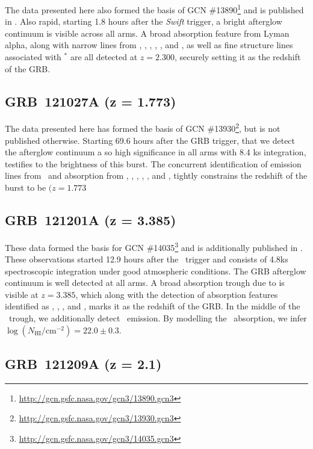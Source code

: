 \documentclass{aa}    %
\begin{document}
The data presented here also formed the basis of GCN
\#13890\footnote{\url{http://gcn.gsfc.nasa.gov/gcn3/13890.gcn3}} and is
published in \citet{Friis2015}. Also rapid, starting 1.8 hours after the
\textit{Swift} trigger, a bright afterglow continuum is visible across all arms.
A broad absorption feature from Lyman alpha, along with narrow lines from \civ,
\SIii, \SIiv, \feii, \sii, and \alii, as well as fine structure lines associated
with \SIii$^*$ are all detected at $z = 2.300$, securely setting it as the
redshift of the GRB.

\subsection{GRB~121027A (z = 1.773)}

The data presented here has formed the basis of GCN
\#13930\footnote{\url{http://gcn.gsfc.nasa.gov/gcn3/13930.gcn3}}, but is not
published otherwise. Starting 69.6 hours after the GRB trigger, that we detect
the afterglow continuum a so high significance in all arms with 8.4 ks
integration, testifies to the brightness of this burst. The concurrent
identification of emission lines from \oiii~and absorption from \civ, \alii,
\aliii, \mgi, \mgii, and \feii, tightly constrains the redshift of the burst to
be $(z = 1.773$

\subsection{GRB~121201A (z = 3.385)}

These data formed the basis for GCN
\#14035\footnote{\url{http://gcn.gsfc.nasa.gov/gcn3/14035.gcn3}} and is
additionally published in \citet{Kruhler2015}. These observations started 12.9
hours after the \swift~trigger and consists of 4.8ks spectroscopic integration
under good atmospheric conditions. The GRB afterglow continuum is well detected
at all arms. A broad absorption trough due to \lya is visible at $z = 3.385$,
which along with the detection of absorption features identified as \SIiv, \civ,
\alii, and \aliii, marks it as the redshift of the GRB. In the middle of the
\lya~trough, we additionally detect \lya~emission. By modelling the
\lya~absorption, we infer $\log (N_{\mathrm{HI}}/\mathrm{cm}^{-2}) = 22.0 \pm
0.3$.

\subsection{GRB~121209A (z = 2.1)}
\end{document}
